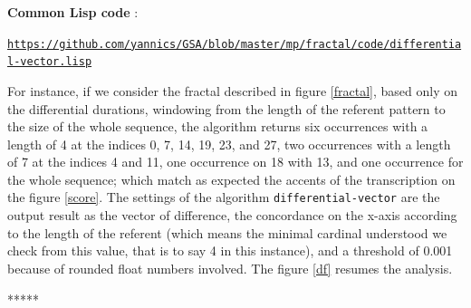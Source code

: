 \documentclass{article}
\begin{document}
\bigskip
\noindent \textbf{Common Lisp code} : 

\noindent \href{https://github.com/yannics/GSA/blob/master/mp/fractal/code/differential-vector.lisp}{\scriptsize \texttt{https://github.com/yannics/GSA/blob/master/mp/fractal/code/differential-vector.lisp}}
\bigskip

For instance, if we consider the fractal described in figure \ref{fractal}, based only on the differential durations, windowing from the length of the referent pattern to the size of the whole sequence, the algorithm returns six occurrences with a length of 4 at the indices 0, 7, 14, 19, 23, and 27, two occurrences with a length of 7 at the indices 4 and 11, one occurrence on 18 with 13, and one occurrence for the whole sequence;
which match as expected the accents of the transcription on the figure \ref{score}. The settings of the algorithm \texttt{differential-vector} are the output result as the vector of difference, the concordance on the x-axis according to the length of the referent (which means the minimal cardinal understood we check from this value, that is to say 4 in this instance), and a threshold of 0.001 because of rounded float numbers involved. The figure \ref{df} resumes the analysis.

\bigskip

\begin{center}
*****
\end{center}
\end{document}
